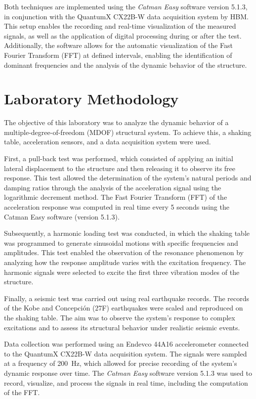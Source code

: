 \documentclass{article}  %
\begin{document}
Both techniques are implemented using the \textit{Catman Easy} software version 5.1.3, in conjunction with the QuantumX CX22B-W data acquisition system by HBM. This setup enables the recording and real-time visualization of the measured signals, as well as the application of digital processing during or after the test. Additionally, the software allows for the automatic visualization of the Fast Fourier Transform (FFT) at defined intervals, enabling the identification of dominant frequencies and the analysis of the dynamic behavior of the structure.


\newpage
\section{Laboratory Methodology}

The objective of this laboratory was to analyze the dynamic behavior of a multiple-degree-of-freedom (MDOF) structural system. To achieve this, a shaking table, acceleration sensors, and a data acquisition system were used.

First, a pull-back test was performed, which consisted of applying an initial lateral displacement to the structure and then releasing it to observe its free response. This test allowed the determination of the system’s natural periods and damping ratios through the analysis of the acceleration signal using the logarithmic decrement method. The Fast Fourier Transform (FFT) of the acceleration response was computed in real time every 5 seconds using the Catman Easy software (version 5.1.3).

Subsequently, a harmonic loading test was conducted, in which the shaking table was programmed to generate sinusoidal motions with specific frequencies and amplitudes. This test enabled the observation of the resonance phenomenon by analyzing how the response amplitude varies with the excitation frequency. The harmonic signals were selected to excite the first three vibration modes of the structure.

Finally, a seismic test was carried out using real earthquake records. The records of the Kobe and Concepción (27F) earthquakes were scaled and reproduced on the shaking table. The aim was to observe the system’s response to complex excitations and to assess its structural behavior under realistic seismic events.

Data collection was performed using an Endevco 44A16 accelerometer connected to the QuantumX CX22B-W data acquisition system. The signals were sampled at a frequency of 200~Hz, which allowed for precise recording of the system's dynamic response over time. The \textit{Catman Easy} software version 5.1.3 was used to record, visualize, and process the signals in real time, including the computation of the FFT.
\end{document}
